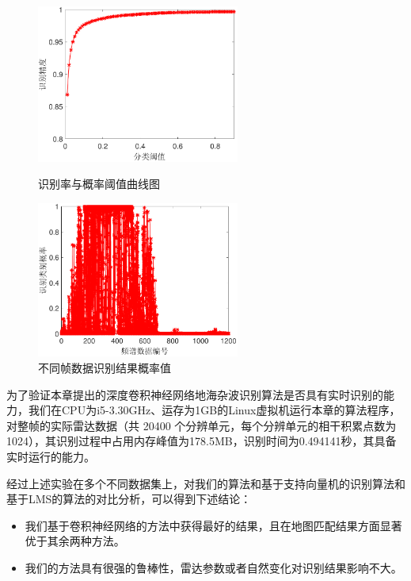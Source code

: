 \begin{figure}[H]
	\centering
	\begin{minipage}{7cm}
		\centering
		\includegraphics[width=6.67cm]{figures/othr/threashold}
		\caption{识别率与概率阈值曲线图}
		\label{fig:threshold}
	\end{minipage}
	\hspace{10pt}
	\begin{minipage}{7cm}
		\centering
		\includegraphics[width=6.67cm]{figures/othr/prob}
		\caption{不同帧数据识别结果概率值}
		\label{fig:prob}
	\end{minipage}

\end{figure}


为了验证本章提出的深度卷积神经网络地海杂波识别算法是否具有实时识别的能力，我们在CPU为i5-3.30GHz、运存为1GB的Linux虚拟机运行本章的算法程序，对整帧的实际雷达数据（共 20400 个分辨单元，每个分辨单元的相干积累点数为1024），其识别过程中占用内存峰值为178.5MB，识别时间为0.494141秒，其具备实时运行的能力。


经过上述实验在多个不同数据集上，对我们的算法和基于支持向量机的识别算法和基于LMS的算法的对比分析，可以得到下述结论：
\begin{itemize}
	\item 我们基于卷积神经网络的方法中获得最好的结果，且在地图匹配结果方面显著优于其余两种方法。
	\item 我们的方法具有很强的鲁棒性，雷达参数或者自然变化对识别结果影响不大。
\end{itemize}


